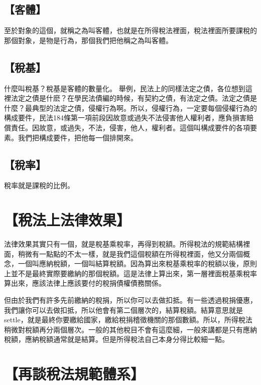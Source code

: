 \documentclass[]{ctexbook}
\begin{document}
\hypertarget{ux5ba2ux9ad4}{%
\subsection{【客體】}\label{ux5ba2ux9ad4}}

至於對象的這個，就稱之為叫客體，也就是在所得稅法裡面，稅法裡面所要課稅的那個對象，是物是行為，那個我們把他稱之為叫客體。

\hypertarget{ux7a05ux57fa}{%
\subsection{【稅基】}\label{ux7a05ux57fa}}

什麼叫稅基？稅基是客體的數量化。
舉例，民法上的同樣法定之債，各位想到這裡法定之債是什麽？在學民法債編的時候，有契約之債，有法定之債。法定之債是什麼？最典型的法定之債，侵權行為啊。所以，侵權行為，一定要每個侵權行為的構成要件，民法184條第一項前段因故意或過失不法侵害他人權利者，應負損害賠償責任。因故意，或過失，不法，侵害，他人，權利者。這個叫構成要件的各項要素。我們把構成要件，把他每一個排開來。

\hypertarget{ux7a05ux7387}{%
\subsection{【稅率】}\label{ux7a05ux7387}}

稅率就是課稅的比例。

\hypertarget{ux7a05ux6cd5ux4e0aux6cd5ux5f8bux6548ux679c}{%
\section{【稅法上法律效果】}\label{ux7a05ux6cd5ux4e0aux6cd5ux5f8bux6548ux679c}}

法律效果其實只有一個，就是稅基乘稅率，再得到稅額。所得稅法的規範結構裡面，稍微有一點點的不太一樣，就是我們這個稅額在所得稅裡面，他又分兩個概念，一個叫應納稅額，一個叫結算稅額。因為算出來稅基乘稅率的稅額以後，原則上並不是最終實際要繳納的那個稅額。這是法律上算出來，第一層裡面稅基乘稅率算出來，應該法律上應該要付的稅捐債權債務關係。

但由於我們有許多先前繳納的稅捐，所以你可以去做扣抵。有一些透過稅捐優惠，我們讓你可以去做扣抵，所以他會有第二個層次的，結算稅額。結算意思就是settle，就是最終你要繳給國家，繳給稅捐稽徵機關的那個數額。所以，所得稅法稍微對稅額再分兩個層次。一般的其他稅目不會有這麼細，一般來講都是只有應納稅額，應納稅額通常就是結算。但是所得稅法自己本身分得比較細一點。

\hypertarget{ux518dux8ac7ux7a05ux6cd5ux898fux7bc4ux9ad4ux7cfb}{%
\section{【再談稅法規範體系】}\label{ux518dux8ac7ux7a05ux6cd5ux898fux7bc4ux9ad4ux7cfb}}
\end{document}
